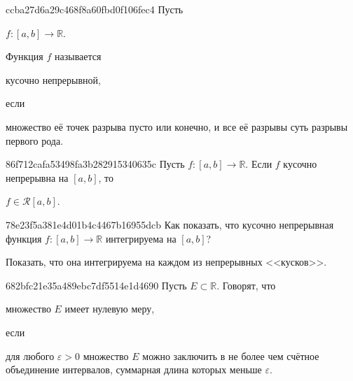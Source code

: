 \begin{note}{ccba27d6a29c468f8a60fbd0f106fec4}
    Пусть \begin{icloze}{3}\({ f : [a, b] \to \mathbb R }\).\end{icloze} Функция \({ f }\) называется \begin{icloze}{2}кусочно непрерывной,\end{icloze} если \begin{icloze}{1}множество её точек разрыва пусто или конечно, и все её разрывы суть разрывы первого рода.\end{icloze}
\end{note}

\begin{note}{86f712cafa53498fa3b282915340635c}
    Пусть \({ f : [a, b] \to \mathbb R }\). Если \({ f }\) кусочно непрерывна на \({ [a, b] }\), то \begin{icloze}{1}\({ f \in \mathcal R[a, b] }\).\end{icloze}
\end{note}

\begin{note}{78e23f5a381e4d01b4c4467b16955dcb}
    Как показать, что кусочно непрерывная функция \({ f : [a, b] \to \mathbb R }\) интегрируема на \({ [a, b] }\)?

    \begin{cloze}{1}
        Показать, что она интегрируема на каждом из непрерывных <<кусков>>.
    \end{cloze}
\end{note}

\begin{note}{682bfc21e35a489ebc7df5514e1d4690}
    Пусть \({ E \subset \mathbb R }\). Говорят, что \begin{icloze}{2}множество \({ E }\) имеет нулевую меру,\end{icloze} если \begin{icloze}{1}для любого \({ \varepsilon > 0 }\) множество \({ E }\) можно заключить  в не более чем счётное объединение интервалов, суммарная длина которых меньше \({ \varepsilon }\).\end{icloze}
\end{note}

